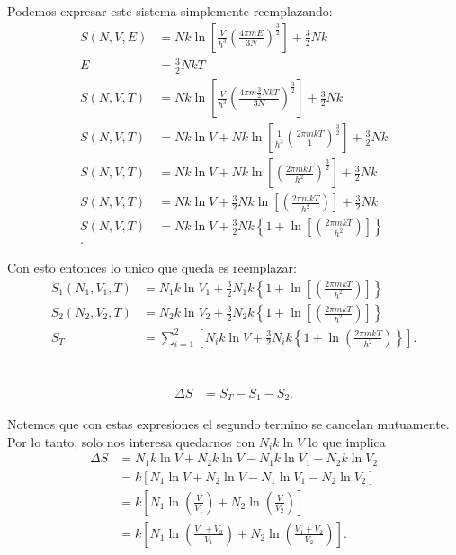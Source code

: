 \documentclass{report}
\begin{document}
\section{}
  Podemos expresar este sistema simplemente reemplazando:
  \begin{align*}
  	S\left(N, V, E\right) &= Nk\ln\left[\frac{V}{h^3}\left(\frac{4 \pi m E}{3N}\right)^{\frac{3}{2}}\right] + \frac{3}{2}Nk \\
	E &= \frac{3}{2}NkT \\
  	S\left(N, V, T\right) &= Nk\ln\left[\frac{V}{h^3}\left(\frac{4 \pi m \frac{3}{2}NkT}{3N}\right)^{\frac{3}{2}}\right] + \frac{3}{2}Nk \\
  	S\left(N, V, T\right) &=Nk\ln V + Nk\ln\left[\frac{1}{h^3}\left(\frac{2 \pi m kT}{1}\right)^{\frac{3}{2}}\right] + \frac{3}{2}Nk \\
  	S\left(N, V, T\right) &=Nk\ln V + Nk\ln\left[\left(\frac{2 \pi m kT}{h^2}\right)^{\frac{3}{2}}\right] + \frac{3}{2}Nk \\
  	S\left(N, V, T\right) &=Nk\ln V + \frac{3}{2}Nk\ln\left[\left(\frac{2 \pi m kT}{h^2}\right)\right] + \frac{3}{2}Nk \\
  	S\left(N, V, T\right) &=Nk\ln V + \frac{3}{2}Nk\left\{ 1 + \ln\left[\left(\frac{2 \pi m kT}{h^2}\right)\right]\right\} \\
  .\end{align*}

  Con esto entonces lo unico que queda es reemplazar:
  \begin{align*}
  	S_1\left(N_1, V_1, T\right) &=N_1k\ln V_1 + \frac{3}{2}N_1k\left\{ 1 + \ln\left[\left(\frac{2 \pi m kT}{h^2}\right)\right]\right\} \\
  	S_2\left(N_2, V_2, T\right) &=N_2k\ln V_2 + \frac{3}{2}N_2k\left\{ 1 + \ln\left[\left(\frac{2 \pi m kT}{h^2}\right)\right]\right\} \\
	S_T &= \sum_{i=1}^{2} \left[ N_ik\ln V + \frac{3}{2}N_ik\left\{ 1 + \ln\left( \frac{2\pi m kT}{h^2} \right)  \right\}  \right]
  .\end{align*}

\section{}
\begin{align*}
  \Delta S &= S_T - S_1 - S_2
.\end{align*}

Notemos que con estas expresiones el segundo termino se cancelan mutuamente. Por lo tanto, solo nos interesa quedarnos con $N_i k\ln V$ lo que implica
\begin{align*}
  \Delta S &= N_1 k\ln V + N_2 k \ln V - N_1 k \ln V_1 - N_2 k \ln V_2 \\
  &= k\left[ N_1 \ln V + N_2 \ln V - N_1 \ln V_1 - N_2 \ln V_2 \right]  \\
  &= k\left[ N_1 \ln \left( \frac{V}{V_1} \right)  + N_2 \ln\left( \frac{V}{V_2} \right) \right]  \\
  &= k\left[ N_1 \ln \left( \frac{V_1 + V_2}{V_1} \right)  + N_2 \ln\left( \frac{V_1 + V_2}{V_2} \right) \right]
.\end{align*}
\end{document}
